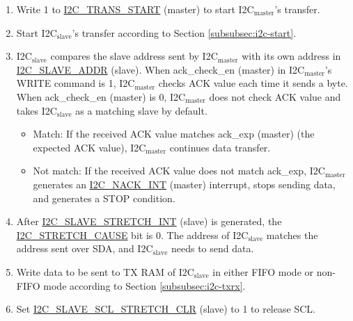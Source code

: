 \documentclass[main\_\_EN.tex]{subfiles}
\begin{document}
\begin{enumerate}
\item Write 1 to \hyperref[fielddesc:I2CTRANSSTART]{I2C\_TRANS\_START} (master) to start I2C$_\text{master}$'s transfer.
\item Start I2C$_\text{slave}$'s transfer according to Section \ref{subsubsec:i2c-start}.
\item I2C$_\text{slave}$ compares the slave address sent by I2C$_\text{master}$ with its own address in \hyperref[fielddesc:I2CSLAVEADDR]{I2C\_SLAVE\_ADDR} (slave). When ack\_check\_en (master) in I2C$_\text{master}$'s WRITE command is 1, I2C$_\text{master}$ checks ACK value each time it sends a byte. When ack\_check\_en (master) is 0, I2C$_\text{master}$ does not check ACK value and takes I2C$_\text{slave}$ as a matching slave by default.
\begin{itemize}
\item Match: If the received ACK value matches ack\_exp (master) (the expected ACK value), I2C$_\text{master}$ continues data transfer.
\item Not match: If the received ACK value does not match ack\_exp, I2C$_\text{master}$ generates an \hyperref[int:i2c-nack]{I2C\_NACK\_INT} (master) interrupt, stops sending data, and generates a STOP condition.
\end{itemize}

\item After \hyperref[int:i2c-slave-stretch]{I2C\_SLAVE\_STRETCH\_INT} (slave) is generated, the \hyperref[fielddesc:I2CSTRETCHCAUSE]{I2C\_STRETCH\_CAUSE} bit is 0. The address of I2C$_\text{slave}$ matches the address sent over SDA, and I2C$_\text{slave}$ needs to send data.

\item Write data to be sent to TX RAM of I2C$_\text{slave}$ in either FIFO mode or non-FIFO mode according to Section \ref{subsubsec:i2c-txrx}.
\item Set \hyperref[fielddesc:I2CSLAVESCLSTRETCHCLR]{I2C\_SLAVE\_SCL\_STRETCH\_CLR} (slave) to 1 to release SCL.


\end{enumerate}
\end{document}
